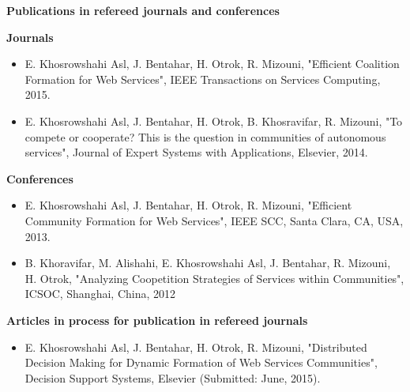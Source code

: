 \newpage
\textbf{Publications in refereed journals and conferences}

\textbf{Journals}

\begin{itemize}
\item E. Khosrowshahi Asl, J. Bentahar, H. Otrok, R. Mizouni, "Efficient Coalition Formation for Web Services", IEEE Transactions on Services Computing, 2015.

\item E. Khosrowshahi Asl, J. Bentahar, H. Otrok, B. Khosravifar, R. Mizouni, "To compete or cooperate? This is the question in communities of autonomous services", Journal of Expert Systems with Applications, Elsevier, 2014.
    
    
\end{itemize}

\textbf{Conferences}

\begin{itemize}
\item E. Khosrowshahi Asl, J. Bentahar, H. Otrok, R. Mizouni, "Efficient Community Formation for Web Services", IEEE SCC, Santa Clara, CA, USA, 2013.

\item B. Khoravifar, M. Alishahi, E. Khosrowshahi Asl, J. Bentahar, R. Mizouni, H. Otrok, "Analyzing Coopetition Strategies of Services within Communities", ICSOC, Shanghai, China, 2012

    
    

\end{itemize}

\textbf{Articles in process for publication in refereed journals}

\begin{itemize}
\item E. Khosrowshahi Asl, J. Bentahar, H. Otrok, R. Mizouni, "Distributed Decision Making for Dynamic Formation of Web Services Communities", Decision Support Systems, Elsevier (Submitted: June, 2015).
\end{itemize}

